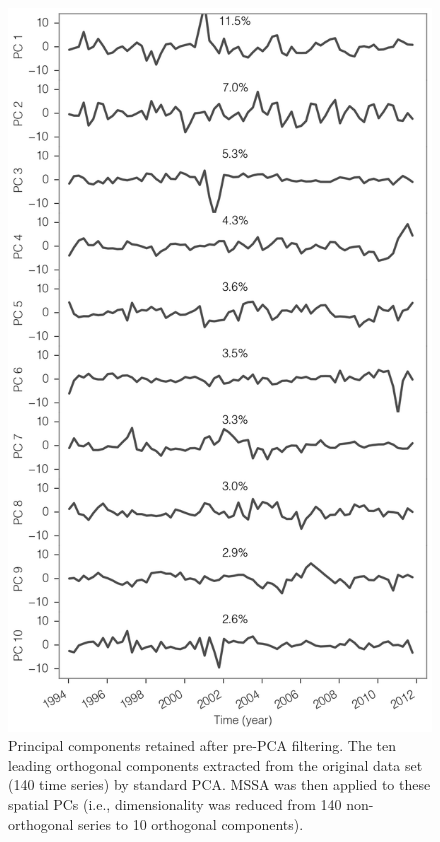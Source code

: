 \begin{figure}[!ht]
  \centering
  \includegraphics[width=.75\textwidth]{img/mssa_pre_pc_v2.png}
  \caption[Principal components retained after pre-PCA filtering]{
  \ssp \footnotesize
  Principal components retained after pre-PCA filtering. The ten leading orthogonal components extracted from the original data set (140 time series) by standard PCA. MSSA was then applied to these spatial PCs (i.e., dimensionality was reduced from 140 non-orthogonal series to 10 orthogonal components).
  }
  \label{c4f10}
\end{figure}


